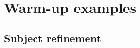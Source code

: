 \documentclass{article}
\begin{document}
\newpage

\section{Warm-up examples}

\subsection{Subject refinement}

\newcommand{\sNN}{\texttt{NN}}
\newcommand{\sNS}{\texttt{NS}}
\newcommand{\sNA}{\texttt{NA}}

\newcommand{\sSN}{\texttt{SN}}
\newcommand{\sSS}{\texttt{SS}}
\newcommand{\sSA}{\texttt{SA}}

\newcommand{\sAN}{\texttt{AN}}
\newcommand{\sAS}{\texttt{AS}}
\newcommand{\sAA}{\texttt{AA}}
\end{document}
